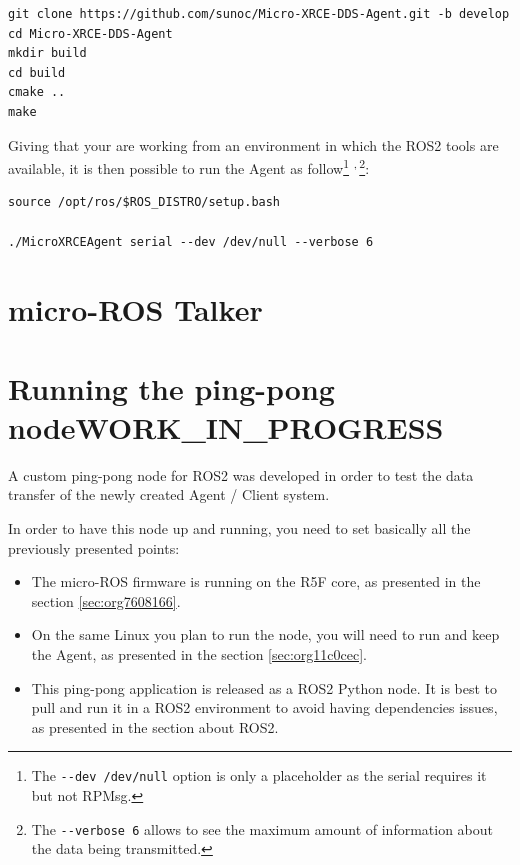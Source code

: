 \documentclass[10pt]{article}
\begin{document}
\begin{verbatim}
git clone https://github.com/sunoc/Micro-XRCE-DDS-Agent.git -b develop
cd Micro-XRCE-DDS-Agent
mkdir build
cd build
cmake ..
make
\end{verbatim}

Giving that your are working from an environment in which the ROS2 tools are available, it is then possible
to run the Agent as follow\footnote{The \texttt{-{}-{}dev /dev/null} option is only a placeholder as the serial requires it but not RPMsg.} \textsuperscript{,}\,\footnote{The \texttt{-{}-{}verbose 6} allows to see the maximum amount of information about the data being transmitted.}:

\begin{verbatim}
source /opt/ros/$ROS_DISTRO/setup.bash

./MicroXRCEAgent serial --dev /dev/null --verbose 6
\end{verbatim}


\clearpage
\section{micro-ROS Talker}
\label{sec:orga359ed7}

\clearpage
\section{Running the ping-pong node\hfill{}\textsc{WORK\_IN\_PROGRESS}}
\label{sec:orgcbe8b7f}
A custom ping-pong node for ROS2 was developed in order to test the data transfer of the newly created
Agent / Client system.

In order to have this node up and running, you need to set basically all the previously presented points:
\begin{itemize}
\item The micro-ROS firmware is running on the R5F core, as presented in the section \ref{sec:org7608166}.
\item On the same Linux you plan to run the node, you will need to run and keep the Agent, as presented
in the section \ref{sec:org11c0cec}.
\item This ping-pong application is released as a ROS2 Python node. It is best to pull and run it
in a ROS2 environment to avoid having dependencies issues, as presented in the section about ROS2.

\clearpage
\end{itemize}
\end{document}
